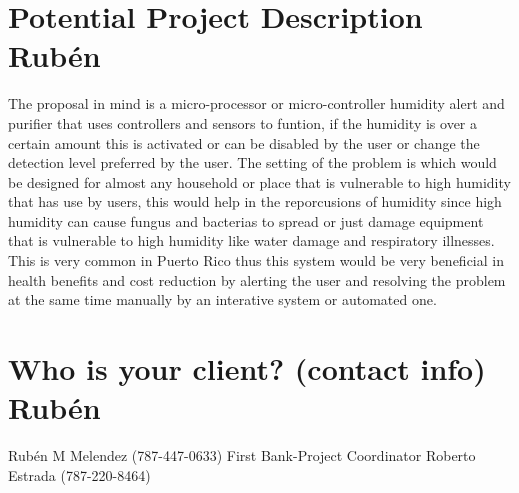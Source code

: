 \section {Potential Project Description Rubén}
The proposal in mind is a micro-processor or micro-controller humidity alert and purifier that uses controllers and sensors to funtion, if the humidity is over a certain amount this is activated or can be disabled by the user or change the detection level preferred by the user. The setting of the problem is which would be designed for almost any household or place that is vulnerable to high humidity that has use by users, this would help in the reporcusions of humidity since high humidity can cause fungus and bacterias to spread or just damage equipment that is vulnerable to high humidity like water damage and respiratory illnesses. This is very common in Puerto Rico thus this system would be very beneficial in health benefits and cost reduction by alerting the user and resolving the problem at the same time manually by an interative system or automated one. 
\newpage
\section{Who is your client? (contact info) Rubén}
Rubén M Melendez (787-447-0633)
\newline
First Bank-Project Coordinator
\newline
Roberto Estrada (787-220-8464)
